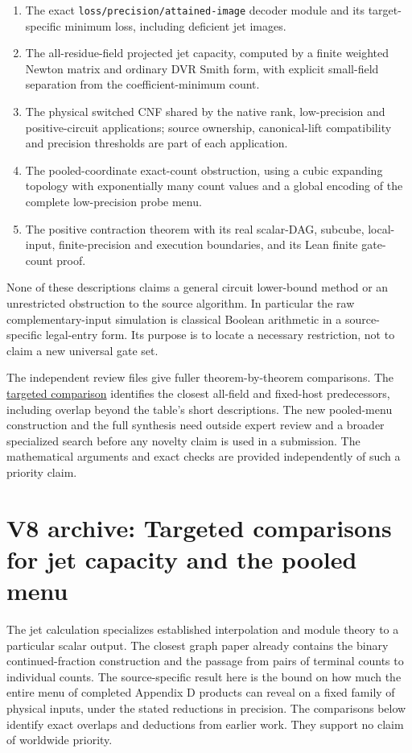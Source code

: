 \documentclass[
  11pt,
]{article}
\providecommand{\tightlist}{%
  \setlength{\itemsep}{0pt}\setlength{\parskip}{0pt}}
\begin{document}
\begin{enumerate}
\def\labelenumi{\arabic{enumi}.}
\tightlist
\item
  The exact \nolinkurl{loss/precision/attained-image} decoder module and
  its target-specific minimum loss, including deficient jet images.
\item
  The all-residue-field projected jet capacity, computed by a finite
  weighted Newton matrix and ordinary DVR Smith form, with explicit
  small-field separation from the coefficient-minimum count.
\item
  The physical switched CNF shared by the native rank, low-precision and
  positive-circuit applications; source ownership, canonical-lift
  compatibility and precision thresholds are part of each application.
\item
  The pooled-coordinate exact-count obstruction, using a cubic expanding
  topology with exponentially many count values and a global encoding of
  the complete low-precision probe menu.
\item
  The positive contraction theorem with its real scalar-DAG, subcube,
  local-input, finite-precision and execution boundaries, and its Lean
  finite gate-count proof.
\end{enumerate}

None of these descriptions claims a general circuit lower-bound method
or an unrestricted obstruction to the source algorithm. In particular
the raw complementary-input simulation is classical Boolean arithmetic
in a source-specific legal-entry form. Its purpose is to locate a
necessary restriction, not to claim a new universal gate set.

The independent review files give fuller theorem-by-theorem comparisons.
The \hyperref[v8-section-final-targeted-audit]{targeted comparison}
identifies the closest all-field and fixed-host predecessors, including
overlap beyond the table's short descriptions. The new pooled-menu
construction and the full synthesis need outside expert review and a
broader specialized search before any novelty claim is used in a
submission. The mathematical arguments and exact checks are provided
independently of such a priority claim.

\section{V8 archive: Targeted comparisons for jet capacity and the pooled menu}\label{v8-section-final-targeted-audit}

The jet calculation specializes established interpolation and module
theory to a particular scalar output. The closest graph paper already
contains the binary continued-fraction construction and the passage from
pairs of terminal counts to individual counts. The source-specific
result here is the bound on how much the entire menu of completed
Appendix D products can reveal on a fixed family of physical inputs,
under the stated reductions in precision. The comparisons below identify
exact overlaps and deductions from earlier work. They support no claim
of worldwide priority.
\end{document}
